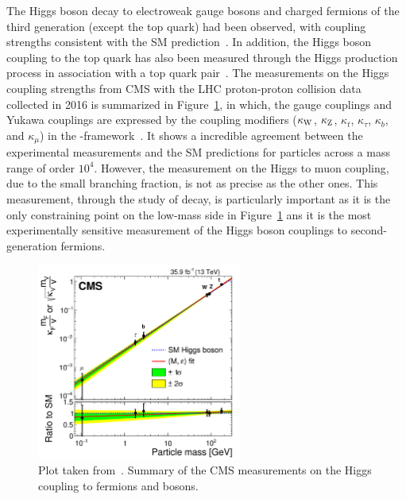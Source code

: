 The Higgs boson decay to electroweak gauge bosons and charged fermions of the third generation (except the top quark) had been observed, 
with coupling strengths consistent with the SM prediction~\cite{Sirunyan:2312121, 201996, Sirunyan:2017exp, PhysRevLett.121.121801, 2018283, PhysRevD.99.072001, 201859, 2019508, Aaboud_2018}.
In addition, the Higgs boson coupling to the top quark has also been measured through the Higgs production process in association with a top quark pair~\cite{PhysRevLett.120.231801, 2018173}.
The measurements on the Higgs coupling strengths from CMS with the LHC proton-proton collision data collected in 2016 is summarized in Figure~\ref{fig:higgs_2016},
in which, the gauge couplings and Yukawa couplings are expressed by the coupling modifiers 
($\kappa_{\mathrm{W}}$, $\kappa_{\mathrm{Z}}$, $\kappa_{t}$, $\kappa_{\tau}$, $\kappa_{b}$, and $\kappa_{\mu}$) in the \kappa-framework~\cite{Heinemeyer:2013tqa}.
It shows a incredible agreement between the experimental measurements and the SM predictions for particles across a mass range of order $10^{4}$.
However, the measurement on the Higgs to muon coupling, due to the small branching fraction, is not as precise as the other ones.
This measurement, through the study of \hmm decay, is particularly important 
as it is the only constraining point on the low-mass side in Figure~\ref{fig:higgs_2016}
ans it is the most experimentally sensitive measurement of the Higgs boson couplings to second-generation fermions.


\begin{figure}[!htb]
    \centering
    \captionsetup{justification=justified}
    \includegraphics[width=0.60\textwidth]{pics/Intro/higgs_coupling_2016.png}
    \caption{Plot taken from~\cite{Sirunyan:2640611}. 
             Summary of the CMS measurements on the Higgs coupling to fermions and bosons.}
    \label{fig:higgs_2016}
\end{figure}



